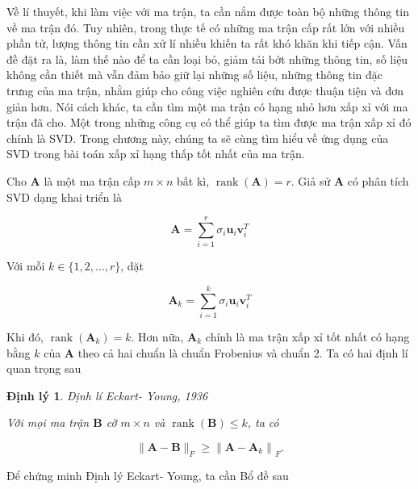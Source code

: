 \documentclass[12pt,a4paper,oneside]{report}
\newtheorem{dl}{Định lý}[section]
\numberwithin{equation}{section}
\begin{document}
Về lí thuyết, khi làm việc với ma trận, ta cần nắm được toàn bộ những thông tin về ma trận đó. Tuy nhiên, trong thực tế có những ma trận cấp rất lớn với nhiều phần tử, lượng thông tin cần xử lí nhiều khiến ta rất khó khăn khi tiếp cận. Vấn đề đặt ra là, làm thế nào để ta cần loại bỏ, giảm tải bớt những thông tin, số liệu không cần thiết mà vẫn đảm bảo giữ lại những số liệu, những thông tin đặc trưng của ma trận, nhằm giúp cho công việc nghiên cứu được thuận tiện và đơn giản hơn. Nói cách khác, ta cần tìm một ma trận có hạng nhỏ hơn xấp xỉ với ma trận đã cho. Một trong những công cụ có thể giúp ta tìm được ma trận xấp xỉ đó chính là SVD. Trong chương này, chúng ta sẽ cùng tìm hiểu về ứng dụng của SVD trong bài toán xấp xỉ hạng thấp tốt nhất của ma trận. 

Cho $\mathbf{A}$ là một ma trận cấp $m \times n$ bất kì, $\operatorname{rank}(\mathbf{A})=r$. Giả sử $\mathbf{A}$ có phân tích SVD dạng khai triển là

$$
\mathbf{A}=\sum_{i=1}^{r} \sigma_{i} \mathbf{u}_{i} \mathbf{v}_{i}^{T}
$$

Với mỗi $k \in\{1,2, \ldots, r\}$, dặt

$$
\mathbf{A}_{k}=\sum_{i=1}^{k} \sigma_{i} \mathbf{u}_{i} \mathbf{v}_{i}^{T}
$$

Khi đó, $\operatorname{rank}\left(\mathbf{A}_{k}\right)=k$. Hơn nữa, $\mathbf{A}_{k}$ chính là ma trận xấp xỉ tốt nhất có hạng bằng $k$ của $\mathbf{A}$ theo cả hai chuẩn là chuẩn Frobenius và chuẩn 2. Ta có hai định lí quan trọng sau

\begin{dl}{Định lí Eckart- Young, 1936}  \label{eckart}

Với mọi ma trận $\mathbf{B}$ cỡ $m \times n$ và $\operatorname{rank}(\mathbf{B}) \leqslant k$, ta có

$$
\|\mathbf{A}-\mathbf{B}\|_{F} \geqslant\left\|\mathbf{A}-\mathbf{A}_{k}\right\|_{F} .
$$
\end{dl}
Để chứng minh Định lý Eckart- Young, ta cần Bổ đề sau
\end{document}
